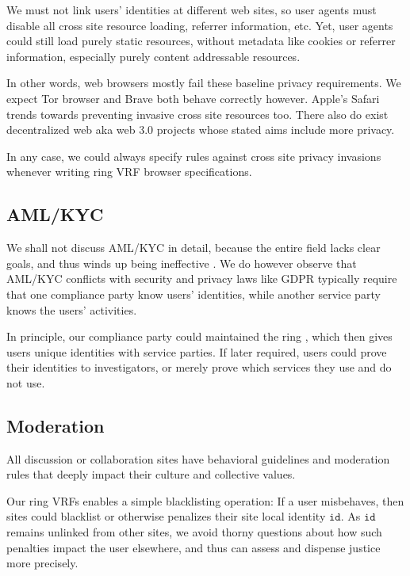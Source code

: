 We must not link users' identities at different web sites, so user agents
must disable all cross site resource loading, referrer information, etc.
Yet, user agents could still load purely static resources, without metadata
like cookies or referrer information, especially purely content addressable
resources.

In other words, web browsers mostly fail these baseline privacy requirements.
We expect Tor browser and Brave both behave correctly however.
Apple's Safari trends towards preventing invasive cross site resources too.  
There also do exist decentralized web aka web 3.0 projects whose stated aims
include more privacy.

In any case, we could always specify rules against cross site privacy invasions
whenever writing ring VRF browser specifications.


\subsection{AML/KYC}

We shall not discuss AML/KYC in detail, because the entire field lacks
clear goals, and thus winds up being ineffective
 \cite{doi:10.1080/25741292.2020.1725366}.
We do however observe that AML/KYC conflicts with security and privacy
laws like GDPR typically require that one compliance party know users'
identities, while another service party knows the users' activities.

In principle, our compliance party could maintained the ring \ctx,
which then gives users unique identities with service parties.
If later required, users could prove their identities to investigators,
or merely prove which services they use and do not use. 


\subsection{Moderation}
\label{subsec:moderation}

All discussion or collaboration sites have behavioral guidelines and
moderation rules that deeply impact their culture and collective values.

Our ring VRFs enables a simple blacklisting operation:
If a user misbehaves, then sites could blacklist or otherwise penalizes
their site local identity $\mathtt{id}$.
As $\mathtt{id}$ remains unlinked from other sites, we avoid thorny
questions about how such penalties impact the user elsewhere, and thus
can assess and dispense justice more precisely. 

